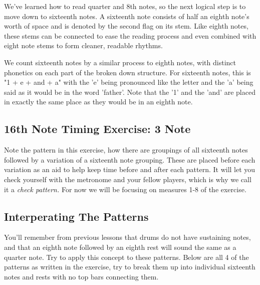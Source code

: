 \documentclass[12pt,letterpaper]{book}
\begin{document}
We've learned how to read quarter and 8th notes, so the next logical step is to move down to sixteenth notes.  A sixteenth note consists of half an eighth note's worth of space and is denoted by the second flag on its stem.  Like eighth notes, these stems can be connected to ease the reading process and even combined with eight note stems to form cleaner, readable rhythms.


We count sixteenth notes by a similar process to eighth notes, with distinct phonetics on each part of the broken down structure.  For sixteenth notes, this is "1 + e +  and + a" with the 'e' being pronounced like the letter and the 'a' being said as it would be in the word 'father'.  Note that the '1' and the 'and' are placed in exactly the same place as they would be in an eighth note.


\subsection{16th Note Timing Exercise: 3 Note}

Note the pattern in this exercise, how there are groupings of all sixteenth notes followed by a variation of a sixteenth note grouping.  These are placed before each variation as an aid to help keep time before and after each pattern.  It will let you check yourself with the metronome and your fellow players, which is why we call it a \textit{check pattern.}  For now we will be focusing on measures 1-8 of the exercise.

\subsection{Interperating The Patterns}

You'll remember from previous lessons that drums do not have sustaining notes, and that an eighth note followed by an eighth rest will sound the same as a quarter note.  Try to apply this concept to these patterns.  Below are all 4 of the patterns as written in the exercise, try to break them up into individual sixteenth notes and rests with no top bars connecting them.

\end{document}
